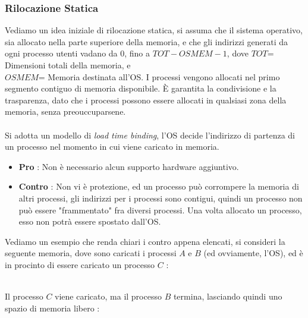 \documentclass[12pt, letterpaper]{article}
\newcommand{\acc}{\\\hphantom{}\\}
\begin{document}
\subsubsection{Rilocazione Statica}
Vediamo un idea iniziale di rilocazione statica, si assuma che il sistema operativo, sia allocato nella parte superiore 
della memoria, e che gli indirizzi generati da ogni processo utenti vadano da 0, fino a \(TOT-OSMEM-1\), dove \(TOT\)= Dimensioni 
totali della memoria, e \\ \(OSMEM\)= Memoria destinata all'OS. I processi vengono allocati nel primo segmento contiguo di memoria 
disponibile. È garantita la condivisione e la trasparenza, dato che i processi possono essere allocati in qualsiasi 
zona della memoria, senza preouccuparsene.\acc 
Si adotta un modello di  \textit{load time binding}, l'OS decide l'indirizzo di partenza di un processo 
nel momento in cui viene caricato in memoria. \begin{itemize}
    \item \textbf{Pro} : Non è necessario alcun supporto hardware aggiuntivo.
    \item \textbf{Contro} : Non vi è protezione, ed un processo può corrompere la memoria di altri processi, gli indirizzi 
    per i processi sono contigui, quindi un processo non può essere "frammentato" fra diversi processi. Una volta allocato un 
    processo, esso non potrà essere spostato dall'OS.
\end{itemize}
Vediamo un esempio che renda chiari i contro appena elencati, si consideri la seguente memoria, dove sono caricati 
i processi \(A\) e \(B\) (ed ovviamente, l'OS), ed è in procinto di essere caricato un processo \(C\) :
\begin{figure}[h]
\end{figure}\\
Il processo \(C\) viene caricato, ma il processo \(B\) termina, lasciando quindi uno spazio di memoria libero :
\begin{figure}[h]
\end{figure}\\
\end{document}

